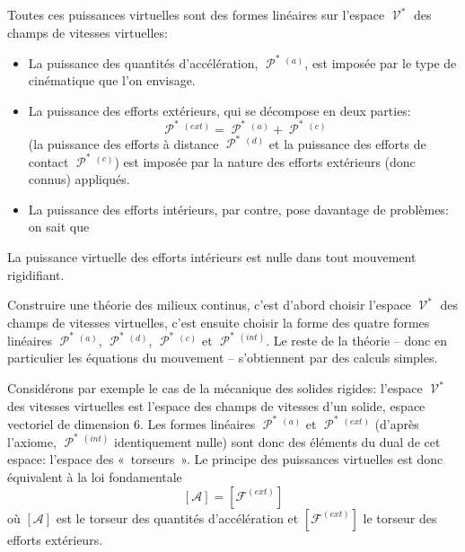 Toutes ces puissances virtuelles sont des formes linéaires sur l'espace $\mathop{\mathcal{V}}^{\ast}$ des champs de vitesses virtuelles:
\begin{itemize}
    \item La puissance des quantités d'accélération, $\mathop{\mathcal{P}}^{\ast}{\!}^{(a)}$, est imposée par le type de cinématique que l'on envisage.
    \item La puissance des efforts extérieurs, qui se décompose en deux parties:
        \begin{equation}
            \mathop{\mathcal{P}}^{\ast}{\!}^{(ext)} = \mathop{\mathcal{P}}^{\ast}{\!}^{(a)} + \mathop{\mathcal{P}}^{\ast}{\!}^{(c)}
            \label{eq:Ch01-031}
        \end{equation}
        (la puissance des efforts à distance $\mathop{\mathcal{P}}^{\ast}{\!}^{(d)}$ et la puissance des efforts de contact $\mathop{\mathcal{P}}^{\ast}{\!}^{(c)}$) est imposée par la nature des efforts extérieurs (donc connus) appliqués.
    \item La puissance des efforts intérieurs, par contre, pose davantage de problèmes:\\
        on sait que
\end{itemize}
\begin{Axiome}[Axiome]
    La puissance virtuelle des efforts intérieurs est nulle dans tout mouvement rigidifiant.
\end{Axiome}

Construire une théorie des milieux continus, c'est d'abord choisir l'espace $\mathop{\mathcal{V}}^{\ast}$ des champs de vitesses virtuelles, c'est ensuite choisir la forme des quatre formes linéaires $\mathop{\mathcal{P}}^{\ast}{\!}^{(a)}$, $\mathop{\mathcal{P}}^{\ast}{\!}^{(d)}$, $\mathop{\mathcal{P}}^{\ast}{\!}^{(c)}$ et $\mathop{\mathcal{P}}^{\ast}{\!}^{(int)}$.
Le reste de la théorie -- donc en particulier les équations du mouvement -- s'obtiennent par des calculs simples.

Considérons par exemple le cas de la mécanique des solides rigides: l'espace $\mathop{\mathcal{V}}^{\ast}$ des vitesses virtuelles est l'espace des champs de vitesses d'un solide, espace vectoriel de dimension 6.
Les formes linéaires $\mathop{\mathcal{P}}^{\ast}{\!}^{(a)}$ et $\mathop{\mathcal{P}}^{\ast}{\!}^{(ext)}$ (d'après l'axiome, $\mathop{\mathcal{P}}^{\ast}{\!}^{(int)}$ identiquement nulle) sont donc des éléments du dual de cet espace: l'espace des «~torseurs~».
Le principe des puissances virtuelles est donc équivalent à la loi fondamentale
\begin{equation}
    \left[ \mathcal{A} \right] = \left[ \mathcal{F}^{(ext)} \right]
    \label{eq:Ch01-032}
\end{equation}
où $\left[ \mathcal{A} \right]$ est le torseur des quantités d'accélération et $\left[ \mathcal{F}^{(ext)} \right]$ le torseur des efforts extérieurs.

